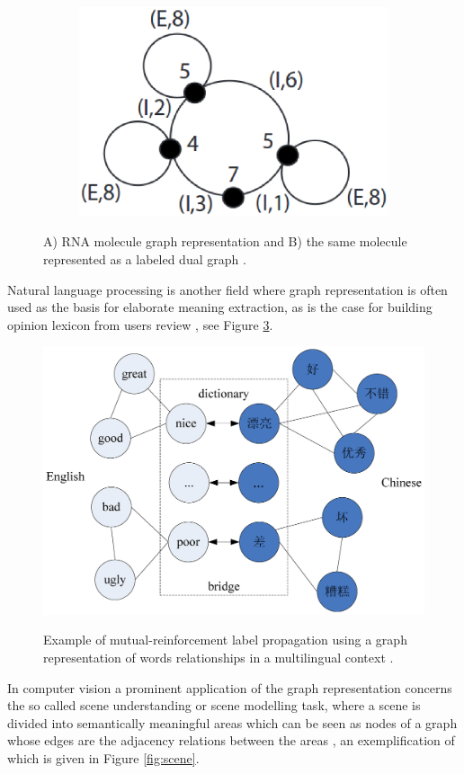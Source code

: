 \begin{figure}[ht]
\begin{subfigure}{.4\textwidth}
        \includegraphics[width=\linewidth]{Figures/ldgrna}
        \label{fig:ldg}
        \caption{}
    \end{subfigure}
    \caption{A) RNA molecule graph representation and B) the same molecule represented
        as a labeled dual graph \cite{conf/psb/KarklinMH05}.}
    \label{fig:bio}
\end{figure}

Natural language processing is another field where graph representation is often used
as the basis for elaborate meaning extraction, as is the case for building opinion
lexicon from users review \cite{10.1371/journal.pone.0079294}, see Figure \ref{fig:wordrel}.

\begin{figure}[ht]
    \centering
    \includegraphics[width=.6\linewidth]{Figures/wordrel}
    \label{fig:wordrel}
    \caption{Example of mutual-reinforcement label propagation using a graph
    representation of words relationships in a multilingual context \cite{10.1371/journal.pone.0079294}.}
\end{figure}

In computer vision a prominent application of the graph representation concerns
the so called scene understanding or scene modelling task, where a scene is divided
into semantically meaningful areas which can be seen as nodes of a graph whose
edges are the adjacency relations between the areas \cite{journals/corr/abs-1108-4079},
an exemplification of which is given in Figure \ref{fig:scene}.

